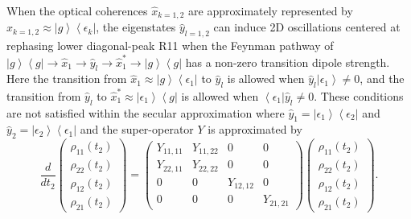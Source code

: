\documentclass[%
 reprint,%
 amssymb, amsmath,%
 aip,cha,%
]{revtex4-1}
\newcommand{\bra}[1]{\ensuremath{\left\langle{#1}\right\vert}}
\newcommand{\ket}[1]{\ensuremath{\left|{#1}\right\rangle}}
\begin{document}
When the optical coherences $\hat{x}_{k=1,2}$ are approximately represented by $\hat{x}_{k=1,2}\approx \ket{g}\bra{\epsilon_k}$, the eigenstates $\hat{y}_{l=1,2}$ can induce 2D oscillations centered at rephasing lower diagonal-peak R11 when the Feynman pathway of $\ket{g}\bra{g}\rightarrow\hat{x}_1\rightarrow\hat{y}_l\rightarrow\hat{x}_1^{*}\rightarrow\ket{g}\bra{g}$ has a non-zero transition dipole strength.  Here the transition from $\hat{x}_1 \approx \ket{g}\bra{\epsilon_1}$ to $\hat{y}_l$ is allowed when $\hat{y}_l\ket{\epsilon_1}\neq0$, and the transition from $\hat{y}_l$ to $\hat{x}_1^{*}\approx\ket{\epsilon_1}\bra{g}$ is allowed when $\bra{\epsilon_1}\hat{y}_l\neq0$.  These conditions are not satisfied within the secular approximation \cite{JeskeJCP2015} where $\hat{y}_1=\ket{\epsilon_1}\bra{\epsilon_2}$ and $\hat{y}_2 = \ket{\epsilon_2}\bra{\epsilon_1}$ and the super-operator $Y$ is approximated by 
\begin{equation}
\frac{d}{dt_2}
\begin{pmatrix}
\rho_{11}(t_2) \\ \rho_{22}(t_2) \\ \rho_{12}(t_2) \\ \rho_{21}(t_2)
\end{pmatrix}
=
\begin{pmatrix}
Y_{11,11} & Y_{11,22} & 0 & 0 \\
Y_{22,11} & Y_{22,22} & 0 & 0 \\
0 & 0 & Y_{12,12} & 0 \\
0 & 0 & 0 & Y_{21,21}
\end{pmatrix}
\begin{pmatrix}
\rho_{11}(t_2) \\ \rho_{22}(t_2) \\ \rho_{12}(t_2) \\ \rho_{21}(t_2)
\end{pmatrix}.
\end{equation}
\end{document}

